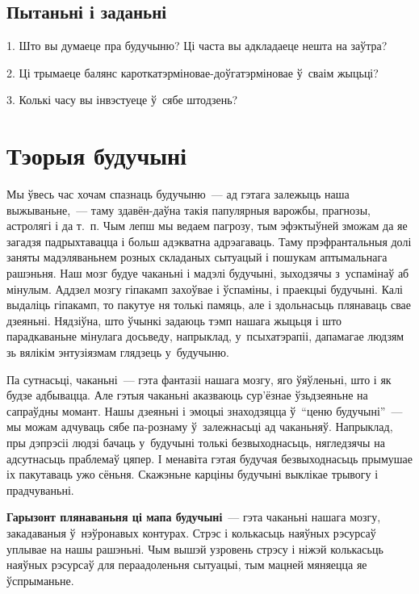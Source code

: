 \subsection*{Пытаньні і заданьні}

1. Што вы думаеце пра будучыню? Ці часта вы адкладаеце нешта на заўтра?

2. Ці трымаеце балянс кароткатэрміновае-доўгатэрміновае ў~сваім жыцьці?

3. Колькі часу вы інвэстуеце ў~сябе штодзень?


\section{Тэорыя будучыні}

Мы ўвесь час хочам спазнаць будучыню~--- ад гэтага залежыць наша выжываньне,~--- таму здавён-даўна такія папулярныя варожбы, прагнозы, астролягі і да т.~п. Чым лепш мы ведаем пагрозу, тым эфэктыўней зможам да яе загадзя падрыхтавацца і больш адэкватна адрэагаваць. Таму прэфрантальныя долі заняты мадэляваньнем розных складаных сытуацый і пошукам аптымальнага рашэньня. Наш мозг будуе чаканьні і мадэлі будучыні, зыходзячы з~успамінаў аб мінулым. Аддзел мозгу гіпакамп захоўвае і ўспаміны, і праекцыі будучыні. Калі выдаліць гіпакамп, то пакутуе ня толькі памяць, але і здольнасьць плянаваць свае дзеяньні. Нядзіўна, што ўчынкі задаюць тэмп нашага жыцьця і што парадкаваньне мінулага досьведу, напрыклад, у~псыхатэрапіі, дапамагае людзям зь вялікім энтузіязмам глядзець у~будучыню.


Па сутнасьці, чаканьні~--- гэта фантазіі нашага мозгу, яго ўяўленьні, што і як будзе адбывацца. Але гэтыя чаканьні аказваюць сур'ёзнае ўзьдзеяньне на сапраўдны момант. Нашы дзеяньні і эмоцыі знаходзяцца ў~``ценю будучыні''~--- мы можам адчуваць сябе па-рознаму ў~залежнасьці ад чаканьняў. Напрыклад, пры дэпрэсіі людзі бачаць у~будучыні толькі безвыходнасьць, нягледзячы на адсутнасьць праблемаў цяпер. І менавіта гэтая будучая безвыходнасьць прымушае іх пакутаваць ужо сёньня. Скажэньне карціны будучыні выклікае трывогу і прадчуваньні.

\textbf{Гарызонт плянаваньня ці мапа будучыні}~--- гэта чаканьні нашага мозгу, закадаваныя ў~нэўронавых контурах. Стрэс і колькасьць наяўных рэсурсаў уплывае на нашы рашэньні. Чым вышэй узровень стрэсу і ніжэй колькасьць наяўных рэсурсаў для пераадоленьня сытуацыі, тым мацней мяняецца яе ўспрыманьне.

